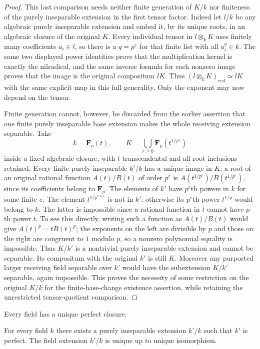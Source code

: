 \begin{proof}
This last comparison needs neither finite
generation of $K/k$ nor finiteness of the purely
inseparable extension in the first tensor factor.
Indeed let $l/k$ be any algebraic purely
inseparable extension and embed it, by its unique
roots, in an algebraic closure of the original
$K$. Every individual tensor in $l\otimes_k K$
uses finitely many coefficients $a_i\in l$,
so there is a $q=p^e$ for that finite list with
all $a_i^q\in k$. The same two displayed power
identities prove that the multiplication kernel
is exactly the nilradical, and the same inverse
formula for each nonzero image proves that the
image is the original compositum $lK$.
Thus $(l\otimes_k K)_{red}\simeq lK$ with the
same explicit map in this full generality.
Only the exponent may now depend on the tensor.

Finite generation cannot, however, be discarded
from the earlier assertion that one finite
purely inseparable base extension makes the
whole receiving extension separable. Take
$$
k=\mathbf F_p(t),\qquad
K=\bigcup_{r\geq0}\mathbf F_p(t^{1/p^r})
$$
inside a fixed algebraic closure, with $t$
transcendental and all root inclusions retained.
Every finite purely inseparable $k'/k$ has a
unique image in $K$: a root of an original
rational function $A(t)/B(t)$ of order $p^r$
is $A(t^{1/p^r})/B(t^{1/p^r})$, since its
coefficients belong to $\mathbf F_p$.
The elements of $k'$ have
$p^e$th powers in $k$ for some finite $e$.
The element $t^{1/p^{e+1}}$ is not in $k'$:
otherwise its $p^e$th power $t^{1/p}$ would
belong to $k$. The latter is impossible since
a rational function in $t$ cannot have $p$th
power $t$. To see this directly, writing such
a function as $A(t)/B(t)$ would give
$A(t)^p=tB(t)^p$; the exponents on the left
are divisible by $p$ and those on the right
are congruent to $1$ modulo $p$, so a nonzero
polynomial equality is impossible.
Thus $K/k'$ is a nontrivial purely inseparable
extension and cannot be separable. Its
compositum with the original $k'$ is still
$K$. Moreover any purported larger receiving
field separable over $k'$ would have the
subextension $K/k'$ separable, again impossible.
This proves the necessity of some restriction
on the original $K/k$ for the finite-base-change
existence assertion, while retaining the
unrestricted tensor-quotient comparison.
\end{proof}

\begin{lemma}
\label{editorial-source-lemma-perfection}
\begin{slogan}
Every field has a unique perfect closure.
\end{slogan}
For every field $k$ there exists a purely inseparable extension
$k'/k$ such that $k'$ is perfect. The field extension
$k'/k$ is unique up to unique isomorphism.
\end{lemma}

